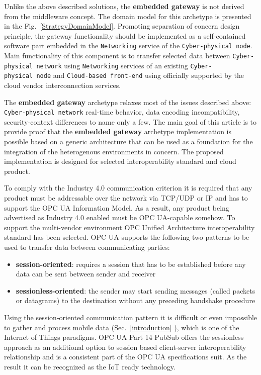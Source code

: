 \documentclass{jacsart}
\providecommand{\tightlist} { \setlength{\itemsep}{0pt}\setlength{\parskip}{0pt}}
\begin{document}
Unlike the above described solutions, the \textbf{embedded gateway} is not derived from the middleware concept. The domain model for this archetype is presented in the Fig.~\ref*{StrategyDomainModel}. Promoting separation of concern design principle, the gateway functionality should be implemented as a self-contained software part embedded in the \texttt{Networking} service of the \texttt{Cyber-physical\ node}. Main functionality of this component is to transfer selected data between \texttt{Cyber-physical\ network} using \texttt{Networking} services of an existing \texttt{Cyber-physical\ node} and \texttt{Cloud-based\ front-end} using officially supported by the cloud vendor interconnection services.

The \textbf{embedded gateway} archetype relaxes most of the issues described above: \texttt{Cyber-physical\ network} real-time behavior, data encoding incompatibility, security-context differences to name only a few. The main goal of this article is to provide proof that the \textbf{embedded gateway} archetype implementation is possible based on a generic architecture that can be used as a foundation for the integration of the heterogenous environments in concern. The proposed implementation is designed for selected interoperability standard and cloud product.

To comply with the Industry 4.0 communication criterion it is required that any product must be addressable over the network via TCP/UDP or IP and has to support the OPC UA Information Model. As a result, any product being advertised as Industry 4.0 enabled must be OPC UA-capable somehow. To support the multi-vendor environment OPC Unified Architecture interoperability standard has been selected. OPC UA supports the following two patterns to be used to transfer data between communicating parties:

\begin{itemize}
      \tightlist
      \item \textbf{session-oriented}: requires a session that has to be established before any data can be sent between sender and receiver
      \item \textbf{sessionless-oriented}: the sender may start sending messages (called packets or datagrams) to the destination without any preceding handshake procedure
\end{itemize}

Using the session-oriented communication pattern it is difficult or even impossible to gather and process mobile data (Sec.~\ref*{introduction} ), which is one of the Internet of Things paradigms. OPC UA Part 14 PubSub \cite{RefWorks:doc:5d98837de4b055984c0eecf0}  offers the sessionless approach as an additional option to session based client-server interoperability relationship and is a consistent part of the OPC UA specifications suit. As the result it can be recognized as the IoT ready technology.
\end{document}
